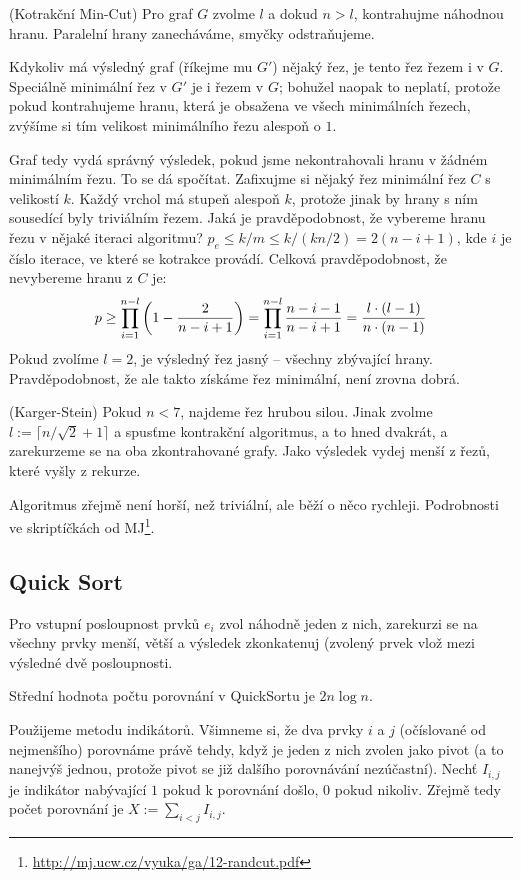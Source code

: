 \alg (Kotrakční Min-Cut) Pro graf $G$ zvolme $l$ a dokud $n > l$, kontrahujme
náhodnou hranu. Paralelní hrany zanecháváme, smyčky odstraňujeme.

Kdykoliv má výsledný graf (říkejme mu $G'$) nějaký řez, je tento řez řezem i v
$G$. Speciálně minimální řez v $G'$ je i řezem v $G$; bohužel naopak to neplatí,
protože pokud kontrahujeme hranu, která je obsažena ve všech minimálních řezech,
zvýšíme si tím velikost minimálního řezu alespoň o $1$.

Graf tedy vydá správný výsledek, pokud jsme nekontrahovali hranu v žádném
minimálním řezu. To se dá spočítat. Zafixujme si nějaký řez minimální řez $C$ s
velikostí $k$. Každý vrchol má stupeň alespoň $k$, protože jinak by hrany s ním
sousedící byly triviálním řezem. Jaká je pravděpodobnost, že vybereme hranu
řezu v nějaké iteraci algoritmu? $p_e \leq k/m \leq k/(kn/2) = 2(n-i+1)$, kde
$i$ je číslo iterace, ve které se kotrakce provádí. Celková pravděpodobnost, že
nevybereme hranu z $C$ je:
\begin{align}
	p \geq \prod_{i=1}^{n-l} \left( 1 - {2 \over n-i+1}\right) =
	\prod_{i=1}^{n-l}{n-i-1 \over n-i+1}
	= {l \cdot (l-1) \over n \cdot (n-1)}
\end{align}
Pokud zvolíme $l=2$, je výsledný řez jasný -- všechny zbývající hrany.
Pravděpodobnost, že ale takto získáme řez minimální, není zrovna dobrá.

\alg (Karger-Stein) Pokud $n < 7$, najdeme řez hrubou silou. Jinak zvolme $l :=
\lceil n/\sqrt 2 +1\rceil$ a spusťme kontrakční algoritmus, a to hned dvakrát, a
zarekurzeme se na oba zkontrahované grafy. Jako výsledek vydej menší z řezů,
které vyšly z rekurze.

Algoritmus zřejmě není horší, než triviální, ale běží o něco rychleji.
Podrobnosti ve skriptíčkách od
MJ\footnote{\url{http://mj.ucw.cz/vyuka/ga/12-randcut.pdf}}.

\subsection{Quick Sort}

\alg Pro vstupní posloupnost prvků $e_i$ zvol náhodně jeden z nich, zarekurzi se
na všechny prvky menší, větší a výsledek zkonkatenuj (zvolený prvek vlož mezi
výsledné dvě posloupnosti.

\vt Střední hodnota počtu porovnání v QuickSortu je $2n \log n$.

\dk Použijeme metodu indikátorů. Všimneme si, že dva prvky $i$ a $j$ (očíslované
od nejmenšího) porovnáme právě tehdy, když je jeden z nich zvolen jako pivot (a
to nanejvýš jednou, protože pivot se již dalšího porovnávání nezúčastní). Nechť
$I_{i,j}$ je indikátor nabývající $1$ pokud k porovnání došlo, $0$ pokud
nikoliv. Zřejmě tedy počet porovnání je $X := \sum_{i < j} I_{i,j}$.

